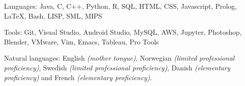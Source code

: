 \documentclass[11pt,letterpaper]{article}
\begin{document}

\spacedhrule{0em}{-0.9em} 



\inlineheadsection 
{Languages:}
{Java, C, C++, Python, R, SQL, HTML, CSS, Javascript, Prolog, {\LaTeX}, Bash, LISP, SML, MIPS}


\inlineheadsection 
{Tools:}
{Git, Visual Studio, Android Studio, MySQL, AWS, Jupyter, Photoshop, Blender, VMware, Vim, Emacs, Tableau, Pro Tools}


\inlineheadsection 
{Natural languages:}
{English \textit{(mother tongue)}, Norwegian \textit{(limited professional proficiency)}, Swedish \textit{(limited professional proficiency)}, Danish \textit{(elementary proficiency)} and French \textit{(elementary proficiency)}.}

\end{document}

